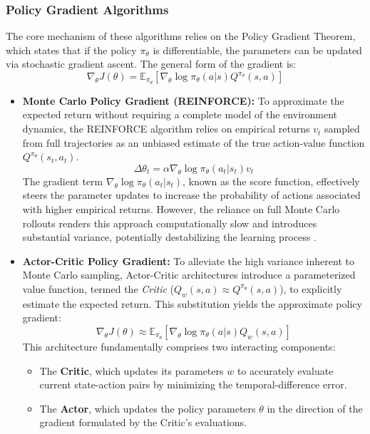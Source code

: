 \documentclass[a4paper]{scrartcl}
\begin{document}
\subsubsection*{Policy Gradient Algorithms}
The core mechanism of these algorithms relies on the Policy Gradient Theorem, which states that if the policy $\pi_\theta$ is differentiable, the parameters can be updated via stochastic gradient ascent. The general form of the gradient is:
\begin{equation}
\nabla_\theta J(\theta) = \mathbb{E}_{\pi_\theta}[\nabla_\theta \log \pi_\theta(a|s) Q^{\pi_\theta}(s,a)]
\end{equation}

\begin{itemize}
    \item \textbf{Monte Carlo Policy Gradient (REINFORCE):}
    To approximate the expected return without requiring a complete model of the environment dynamics, the REINFORCE algorithm relies on empirical returns $v_t$ sampled from full trajectories as an unbiased estimate of the true action-value function $Q^{\pi_\theta}(s_t,a_t)$. 
    \begin{equation}
    \Delta \theta_t = \alpha \nabla_\theta \log \pi_\theta (a_t|s_t) v_t
    \end{equation}
    The gradient term $\nabla_\theta \log \pi_\theta (a_t|s_t)$, known as the score function, effectively steers the parameter updates to increase the probability of actions associated with higher empirical returns. However, the reliance on full Monte Carlo rollouts renders this approach computationally slow and introduces substantial variance, potentially destabilizing the learning process \cite{SuttonBarto2018}.

    \item \textbf{Actor-Critic Policy Gradient:}
    To alleviate the high variance inherent to Monte Carlo sampling, Actor-Critic architectures introduce a parameterized value function, termed the \textit{Critic} ($Q_w(s,a) \approx Q^{\pi_\theta}(s,a)$), to explicitly estimate the expected return. This substitution yields the approximate policy gradient:
    \begin{equation}
    \nabla_\theta J(\theta) \approx \mathbb{E}_{\pi_\theta}[\nabla_\theta \log \pi_\theta(a|s) Q_w(s,a)]
    \end{equation}
    This architecture fundamentally comprises two interacting components:
    \begin{itemize}
        \item The \textbf{Critic}, which updates its parameters $w$ to accurately evaluate current state-action pairs by minimizing the temporal-difference error.
        \item The \textbf{Actor}, which updates the policy parameters $\theta$ in the direction of the gradient formulated by the Critic's evaluations.
    \end{itemize}


\end{itemize}
\end{document}
